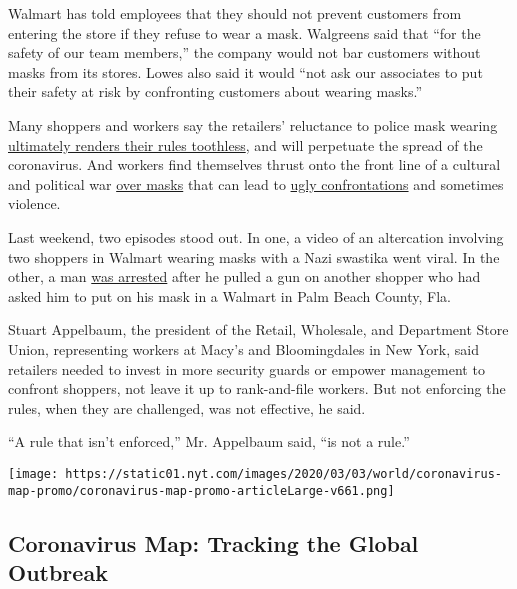Walmart has told employees that they should not prevent customers from
entering the store if they refuse to wear a mask. Walgreens said that
``for the safety of our team members,'' the company would not bar
customers without masks from its stores. Lowes also said it would ``not
ask our associates to put their safety at risk by confronting customers
about wearing masks.''

Many shoppers and workers say the retailers' reluctance to police mask
wearing
\href{https://www.nytimes.com/2020/07/29/business/coronavirus-masks-stores-walmart.html}{ultimately
renders their rules toothless}, and will perpetuate the spread of the
coronavirus. And workers find themselves thrust onto the front line of a
cultural and political war
\href{https://www.nytimes.com/2020/05/03/us/coronavirus-masks-protests.html}{over
masks} that can lead to
\href{https://www.nytimes.com/2020/05/15/us/coronavirus-masks-violence.html?searchResultPosition=105}{ugly
confrontations} and sometimes violence.

Last weekend, two episodes stood out. In one, a video of an altercation
involving two shoppers in Walmart wearing masks with a Nazi swastika
went viral. In the other, a man
\href{https://www.facebook.com/palmbeachcountysheriff/}{was arrested}
after he pulled a gun on another shopper who had asked him to put on his
mask in a Walmart in Palm Beach County, Fla.

Stuart Appelbaum, the president of the Retail, Wholesale, and Department
Store Union, representing workers at Macy's and Bloomingdales in New
York, said retailers needed to invest in more security guards or empower
management to confront shoppers, not leave it up to rank-and-file
workers. But not enforcing the rules, when they are challenged, was not
effective, he said.

``A rule that isn't enforced,'' Mr. Appelbaum said, ``is not a rule.''

\href{https://www.nytimes.com/interactive/2020/world/coronavirus-maps.html}{}

\texttt{[image: https://static01.nyt.com/images/2020/03/03/world/coronavirus-map-promo/coronavirus-map-promo-articleLarge-v661.png]}

\hypertarget{coronavirus-map-tracking-the-global-outbreak}{%
\subsection{Coronavirus Map: Tracking the Global
Outbreak}\label{coronavirus-map-tracking-the-global-outbreak}}


